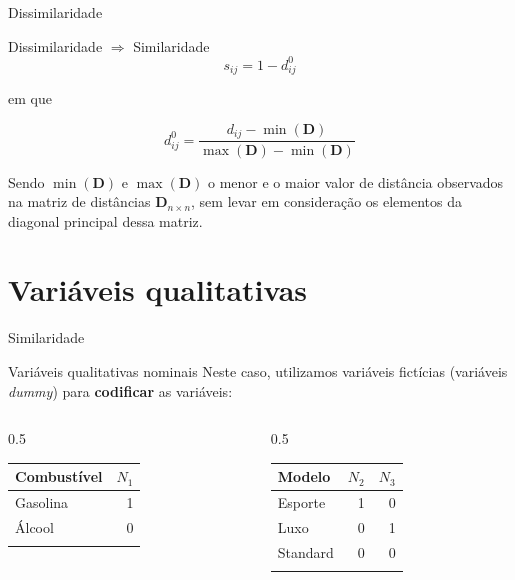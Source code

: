 \documentclass[
  ignorenonframetext,
  aspectratio=169,
]{beamer}
\begin{document}
\begin{frame}{Dissimilaridade}
\label{dissimilaridade-6}
\begin{block}{Dissimilaridade \(\Longrightarrow\) Similaridade}
\label{dissimilaridade-longrightarrow-similaridade}
\[s_{ij} = 1 - d_{ij}^0\]

em que

\[d_{ij}^0 = \displaystyle{\frac{d_{ij} - \min(\boldsymbol{D})}{\max(\boldsymbol{D}) - \min(\boldsymbol{D})}}\]

Sendo \(\min(\boldsymbol{D})\) e \(\max(\boldsymbol{D})\) o menor e o
maior valor de distância observados na matriz de distâncias
\(\boldsymbol{D}_{n \times n}\), sem levar em consideração os elementos
da diagonal principal dessa matriz.
\end{block}
\end{frame}

\section{Variáveis qualitativas}\label{variuxe1veis-qualitativas}

\begin{frame}{Similaridade}
\label{similaridade}
\begin{block}{Variáveis qualitativas nominais}
\label{variuxe1veis-qualitativas-nominais}
Neste caso, utilizamos variáveis fictícias (variáveis \emph{dummy}) para
\textbf{codificar} as variáveis:

\begin{columns}[T]
\begin{column}{0.5\linewidth}
\begin{longtable}[]{@{}lr@{}}
\toprule\noalign{}
Combustível & \(N_1\) \\
\midrule\noalign{}
\endhead
Gasolina & 1 \\
Álcool & 0 \\
\bottomrule\noalign{}
\end{longtable}
\end{column}

\begin{column}{0.5\linewidth}
\begin{longtable}[]{@{}lrr@{}}
\toprule\noalign{}
Modelo & \(N_2\) & \(N_3\) \\
\midrule\noalign{}
\endhead
Esporte & 1 & 0 \\
Luxo & 0 & 1 \\
Standard & 0 & 0 \\
\bottomrule\noalign{}
\end{longtable}
\end{column}
\end{columns}
\end{block}
\end{frame}
\end{document}
